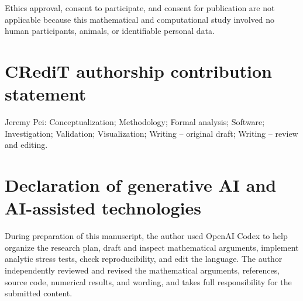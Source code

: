 \documentclass[11pt]{article}
\theoremstyle{definition}
\begin{document}
Ethics approval, consent to participate, and consent for publication are not
applicable because this mathematical and computational study involved no human
participants, animals, or identifiable personal data.

\section*{CRediT authorship contribution statement}

Jeremy Pei: Conceptualization; Methodology; Formal analysis; Software;
Investigation; Validation; Visualization; Writing -- original draft; Writing --
review and editing.

\section*{Declaration of generative AI and AI-assisted technologies}

During preparation of this manuscript, the author used OpenAI Codex to help
organize the research plan, draft and inspect mathematical arguments, implement
analytic stress tests, check reproducibility, and edit the language.  The
author independently reviewed and revised the mathematical arguments,
references, source code, numerical results, and wording, and takes full
responsibility for the submitted content.
\end{document}
